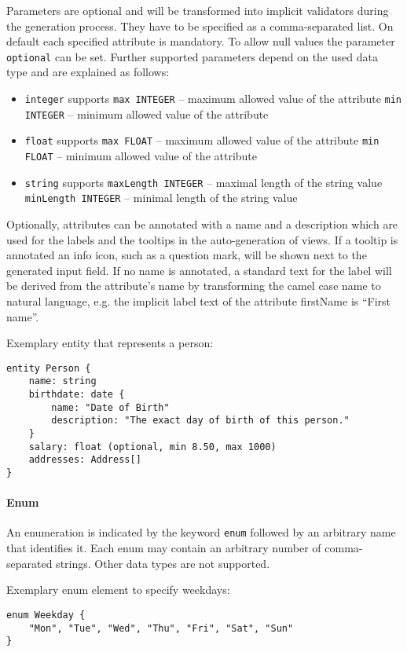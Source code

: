 Parameters are optional and will be transformed into implicit validators during the generation process. They have to be specified as a comma-separated list. On default each specified attribute is mandatory. To allow null values the parameter \lstinline!optional! can be set. Further supported parameters depend on the used data type and are explained as follows:

\begin{itemize}
\item \lstinline!integer! supports
\subitem \lstinline!max INTEGER! – maximum allowed value of the attribute
\subitem \lstinline!min INTEGER! – minimum allowed value of the attribute
\item \lstinline!float! supports
\subitem \lstinline!max FLOAT! – maximum allowed value of the attribute
\subitem \lstinline!min FLOAT! – minimum allowed value of the attribute
\item \lstinline!string! supports
\subitem \lstinline!maxLength INTEGER! – maximal length of the string value
\subitem \lstinline!minLength INTEGER! – minimal length of the string value
\end{itemize}

Optionally, attributes can be annotated with a name and a description which are used for the labels and the tooltips in the auto-generation of views. If a tooltip is annotated an info icon, such as a question mark, will be shown next to the generated input field. If no name is annotated, a standard text for the label will be derived from the attribute's name by transforming the camel case name to natural language, e.g. the implicit label text of the attribute firstName is \enquote{First name}.

Exemplary entity that represents a person:
\begin{lstlisting}
entity Person {
	name: string
	birthdate: date {
		name: "Date of Birth"
		description: "The exact day of birth of this person."
	}
	salary: float (optional, min 8.50, max 1000)
	addresses: Address[]
}
\end{lstlisting}

\paragraph{Enum}
An enumeration is indicated by the keyword \lstinline!enum! followed by an arbitrary name that identifies it. Each enum may contain an arbitrary number of comma-separated strings. Other data types are not supported.

Exemplary enum element to specify weekdays:
\begin{lstlisting}
enum Weekday {
	"Mon", "Tue", "Wed", "Thu", "Fri", "Sat", "Sun"
}
\end{lstlisting}